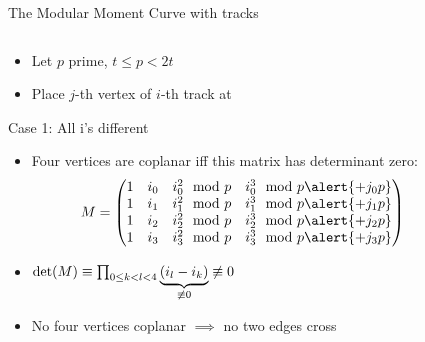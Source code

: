 \documentclass[t]{beamer}
\begin{document}
\begin{frame}{The Modular Moment Curve with tracks}
    \vspace{-0.5cm}
    \begin{columns}
	\begin{column}{0.5\textwidth}
		\begin{itemize}
		    \item <+-> Let $p$ prime, $t\le p<2t$
		    \item
			Place $j$-th vertex of $i$-th track at  \\
			\end{itemize}
			Case 1: All i's different
			\begin{itemize}
		    \item Four vertices are coplanar iff this matrix has determinant zero:
			\begin{equation*}
			    M = \begin{pmatrix}
				{1}&i_0&i_0^2\mod p&i_0^3\mod p \alert{+j_0p}\\
				{1}&i_1&i_1^2\mod p&i_1^3\mod p \alert{+j_1p}\\
				{1}&i_2&i_2^2\mod p&i_2^3\mod p \alert{+j_2p}\\
				{1}&i_3&i_3^2\mod p&i_3^3\mod p \alert{+j_3p}\\
			    \end{pmatrix}
			\end{equation*}
		    \item 
			\(\det(M) \equiv \mathrlap{\prod_{0 \le k < l < 4} \underbrace{(i_l - i_k)}_{\not\equiv 0} \not\equiv0 \pmod p}\)
		    \item No four vertices coplanar \linebreak $\implies$ no two edges cross
		\end{itemize}
	\end{column}
	    \begin{column}{0.5\textwidth}
		\begin{center}
		\end{center}
	    \end{column}
    \end{columns}
\end{frame}
\end{document}
